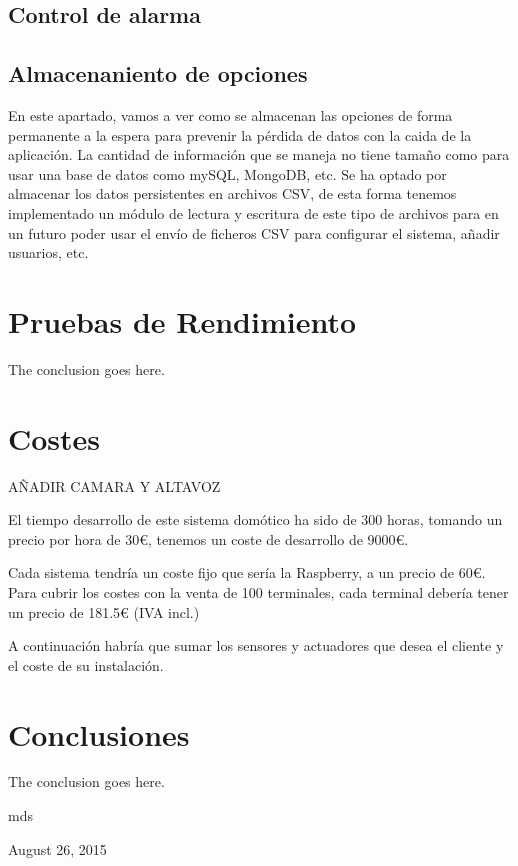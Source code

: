 \documentclass[10pt,journal,compsoc]{IEEEtran}
\begin{document}
\subsection{Control de alarma}

\subsection{Almacenaniento de opciones}
En este apartado, vamos a ver como se almacenan las opciones de forma permanente a la espera para prevenir la pérdida de datos con la caida de la aplicación. La cantidad de información que se maneja no tiene tamaño como para usar una base de datos como mySQL, MongoDB, etc. 
Se ha optado por almacenar los datos persistentes en archivos CSV, de esta forma tenemos implementado un módulo de lectura y escritura de este tipo de archivos para en un futuro poder usar el envío de ficheros CSV para configurar el sistema, añadir usuarios, etc.

\section{Pruebas de Rendimiento}
The conclusion goes here.

\section{Costes}
AÑADIR CAMARA Y ALTAVOZ

El tiempo desarrollo de este sistema domótico ha sido de 300 horas, tomando un precio por hora de 30\euro, tenemos un coste de desarrollo de 9000\euro.

Cada sistema tendría un coste fijo que sería la Raspberry, a un precio de 60\euro. Para cubrir los costes con la venta de 100 terminales, cada terminal debería tener un precio de 181.5\euro
(IVA incl.)

A continuación habría que sumar los sensores y actuadores que desea el cliente y el coste de su instalación.

\section{Conclusiones}
The conclusion goes here.

\hfill mds
 
\hfill August 26, 2015

\end{document}

